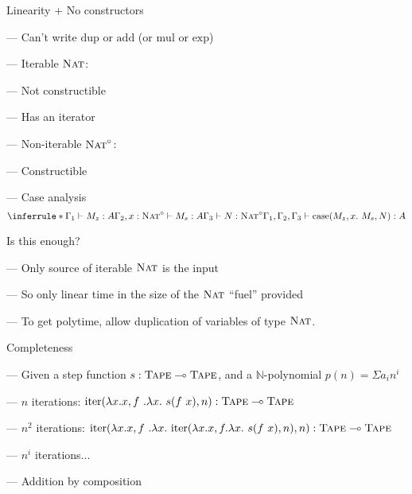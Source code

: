 \documentclass[xetex,serif,mathserif,aspectratio=169]{beamer}
\newcommand{\youtem}{\quad \textcolor{titlered!80}{---} \quad}
\newcommand{\HEAD}[1]{\textcolor{titlered}{#1}}
\begin{document}
\begin{frame}
  \HEAD{Linearity + No constructors}

  \medskip

  \youtem Can't write $\mathrm{dup}$ or $\mathrm{add}$ (or $\mathrm{mul}$ or $\mathrm{exp}$)

  \pause
  \bigskip

  \youtem Iterable $\textsc{Nat}$:

  \quad \youtem Not constructible

  \quad \youtem Has an iterator

  \pause
  \bigskip

  \youtem Non-iterable $\textsc{Nat}^\circ$:

  \quad \youtem Constructible

  \quad \youtem Case analysis
  \begin{displaymath}
    \inferrule*
    {\Gamma_1 \vdash M_z : A \\ \Gamma_2, x : \TyNat^\circ \vdash M_s : A \\ \Gamma_3 \vdash N : \TyNat^\circ}
    {\Gamma_1, \Gamma_2, \Gamma_3 \vdash \mathrm{case}(M_z, x.~M_s, N) : A}
  \end{displaymath}

\end{frame}

\begin{frame}
  \HEAD{Is this enough?}

  \bigskip

  \youtem Only source of iterable $\textsc{Nat}$ is the input

  \smallskip

  \youtem So only linear time in the size of the $\textsc{Nat}$ ``fuel'' provided

  \smallskip

  \youtem To get polytime, allow duplication of variables of type $\textsc{Nat}$.

  \bigskip
  \pause

  \HEAD{Completeness}

  \medskip

  \youtem Given a step function $s : \textsc{Tape} \multimap \textsc{Tape}$, and a $\mathbb{N}$-polynomial $p(n) = \Sigma a_i n^i$

  \smallskip

  \youtem $n$ iterations: $\mathrm{iter}(\lambda x.x, f~.\lambda x.~s(f~x), n) : \textsc{Tape} \multimap \textsc{Tape}$

  \smallskip

  \youtem $n^2$ iterations: $\mathrm{iter}(\lambda x.x, f~.\lambda x.~\mathrm{iter}(\lambda x.x, f.\lambda x.~s(f~x),n), n) : \textsc{Tape} \multimap \textsc{Tape}$

  \smallskip

  \youtem $n^i$ iterations...

  \smallskip

  \youtem Addition by composition
\end{frame}
\end{document}
